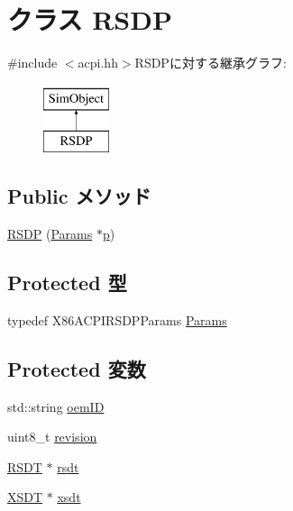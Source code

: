 \hypertarget{classX86ISA_1_1ACPI_1_1RSDP}{
\section{クラス RSDP}
\label{classX86ISA_1_1ACPI_1_1RSDP}
}


{\ttfamily \#include $<$acpi.hh$>$}RSDPに対する継承グラフ:\begin{figure}[H]
\begin{center}
\leavevmode
\includegraphics[height=2cm]{classX86ISA_1_1ACPI_1_1RSDP}
\end{center}
\end{figure}
\subsection*{Public メソッド}
\begin{DoxyCompactItemize}
\item 
\hyperlink{classX86ISA_1_1ACPI_1_1RSDP_a7e949d21cd51426624a6408dc06f393c}{RSDP} (\hyperlink{classX86ISA_1_1ACPI_1_1RSDP_a031f22f0e242bdc57633b2ac2c5559f3}{Params} $\ast$\hyperlink{namespaceX86ISA_af675c1d542a25b96e11164b80809a856}{p})
\end{DoxyCompactItemize}
\subsection*{Protected 型}
\begin{DoxyCompactItemize}
\item 
typedef X86ACPIRSDPParams \hyperlink{classX86ISA_1_1ACPI_1_1RSDP_a031f22f0e242bdc57633b2ac2c5559f3}{Params}
\end{DoxyCompactItemize}
\subsection*{Protected 変数}
\begin{DoxyCompactItemize}
\item 
std::string \hyperlink{classX86ISA_1_1ACPI_1_1RSDP_a6fbe7411ccf0e5a919c00e383ebc634b}{oemID}
\item 
uint8\_\-t \hyperlink{classX86ISA_1_1ACPI_1_1RSDP_ab01c6e281b316b1770d5646f3d3101c4}{revision}
\item 
\hyperlink{classX86ISA_1_1ACPI_1_1RSDT}{RSDT} $\ast$ \hyperlink{classX86ISA_1_1ACPI_1_1RSDP_aefc1e73432c198f5beb7a012e2964672}{rsdt}
\item 
\hyperlink{classX86ISA_1_1ACPI_1_1XSDT}{XSDT} $\ast$ \hyperlink{classX86ISA_1_1ACPI_1_1RSDP_ab9279cabd99f9f00c481a70df216eff0}{xsdt}
\end{DoxyCompactItemize}

